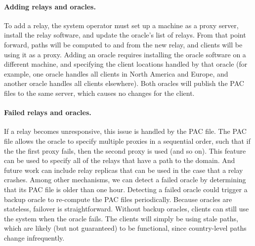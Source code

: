 \paragraph{Adding relays and oracles.} To add a relay, the system
operator must set up a machine as a proxy server, install the \system{}
relay software, and update the oracle's list of relays.  From that point
forward, paths will be computed to and from the new relay, and clients
will be using it as a proxy.  Adding an oracle requires installing the
oracle software on a different machine, and specifying the client
locations handled by that oracle (for example, one oracle handles all
clients in North America and Europe, and another oracle handles all clients
elsewhere).  Both oracles will publish the PAC files to the same server,
which causes no changes for the client.

\paragraph{Failed relays and oracles.} If a relay becomes unresponsive,
this issue is handled by the PAC file.  The PAC file allows the oracle
to specify multiple proxies in a sequential order, such that if the the
first proxy fails, then the second proxy is used (and so on).  This
feature can be used to specify all of the relays that have a path to the
domain.  And future work can include relay replicas that can be used in
the case that a relay crashes.  Among other mechanisms, we can detect a
failed oracle by determining that its PAC file is older than one hour.
Detecting a failed oracle could trigger a backup oracle to re-compute
the PAC files periodically.  Because oracles are stateless, failover is
straightforward.  Without backup oracles, clients can still use the
system when the oracle fails.  The clients will simply be using stale
paths, which are likely (but not guaranteed) to be functional, since
country-level paths change infrequently.


